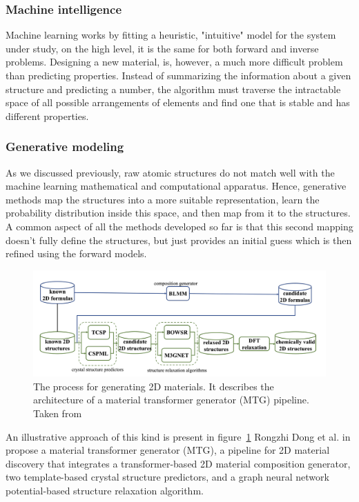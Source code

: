 \subsubsection{Machine intelligence}
\label{subsec:intelligence}
Machine learning works by fitting a heuristic, "intuitive" model for the system under study, on the high level, it is the same for both forward and inverse problems. Designing a new material, is, however, a much more difficult problem than predicting properties. Instead of summarizing the information about a given structure and predicting a number, the algorithm must traverse the intractable space of all possible arrangements of elements and find one that is stable and has different properties.

\subsubsection{Generative modeling}
As we discussed previously, raw atomic structures do not match well with the machine learning mathematical and computational apparatus. Hence, generative methods map the structures into a more suitable representation, learn the probability distribution inside this space, and then map from it to the structures. A common aspect of all the methods developed so far is that this second mapping doesn't fully define the structures, but just provides an initial guess which is then refined using the forward models.

\begin{figure}[h]
    \noindent
    \centering
    \includegraphics[width=\textwidth]{figures/mat_discovery_pipeline.png}
    \caption{The process for generating 2D materials. It describes the architecture of a material transformer generator (MTG) pipeline. Taken from \cite{dongDiscovery2DMaterials2023}}
    \label{fig:mtg}
\end{figure}
An illustrative approach of this kind is present in figure~\ref{fig:mtg} Rongzhi Dong et al. in \cite{dongDiscovery2DMaterials2023} propose a material transformer generator (MTG), a pipeline for 2D material discovery that integrates a transformer-based 2D material composition generator, two template-based crystal structure predictors, and a graph neural network potential-based structure relaxation algorithm.

